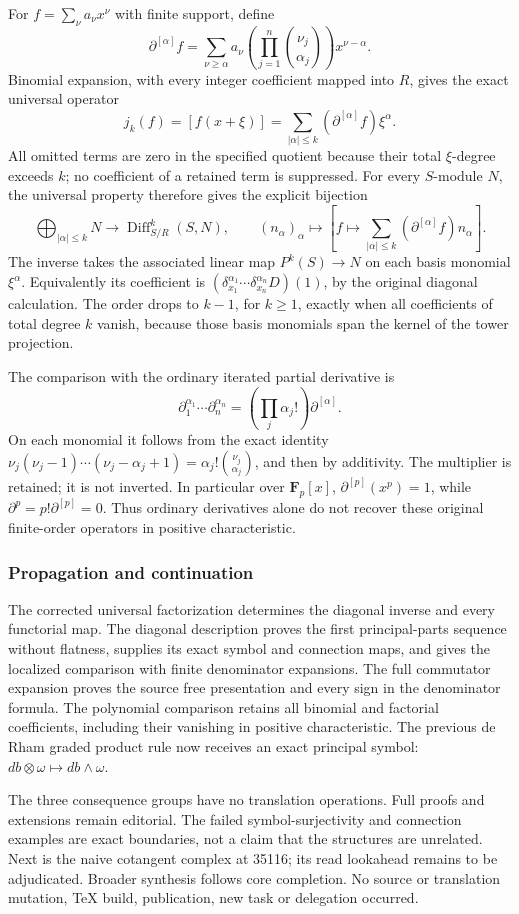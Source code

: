 For \(f=\sum_\nu a_\nu x^\nu\) with finite support, define \[
\partial^{[\alpha]}f
=\sum_{\nu\ge\alpha}a_\nu\left(\prod_{j=1}^n\binom{\nu_j}{\alpha_j}\right)x^{\nu-\alpha}.
\] Binomial expansion, with every integer coefficient mapped into \(R\), gives the exact universal operator \[
j_k(f)=[f(x+\xi)]=\sum_{|\alpha|\le k}(\partial^{[\alpha]}f)\xi^\alpha.
\] All omitted terms are zero in the specified quotient because their total \(\xi\)-degree exceeds \(k\); no coefficient of a retained term is suppressed. For every \(S\)-module \(N\), the universal property therefore gives the explicit bijection \[
\bigoplus_{|\alpha|\le k}N\longrightarrow\operatorname{Diff}^k_{S/R}(S,N),
\qquad(n_\alpha)_\alpha\longmapsto\left[f\mapsto\sum_{|\alpha|\le k}(\partial^{[\alpha]}f)n_\alpha\right].
\] The inverse takes the associated linear map \(P^k(S)\to N\) on each basis monomial \(\xi^\alpha\). Equivalently its coefficient is \((\delta_{x_1}^{\alpha_1}\cdots\delta_{x_n}^{\alpha_n}D)(1)\), by the original diagonal calculation. The order drops to \(k-1\), for \(k\ge1\), exactly when all coefficients of total degree \(k\) vanish, because those basis monomials span the kernel of the tower projection.

The comparison with the ordinary iterated partial derivative is \[
\partial_1^{\alpha_1}\cdots\partial_n^{\alpha_n}
=\left(\prod_j\alpha_j!\right)\partial^{[\alpha]}.
\] On each monomial it follows from the exact identity \(\nu_j(\nu_j-1)\cdots(\nu_j-\alpha_j+1)=\alpha_j!\binom{\nu_j}{\alpha_j}\), and then by additivity. The multiplier is retained; it is not inverted. In particular over \(\mathbf F_p[x]\), \(\partial^{[p]}(x^p)=1\), while \(\partial^p=p!\partial^{[p]}=0\). Thus ordinary derivatives alone do not recover these original finite-order operators in positive characteristic.

\subsubsection{Propagation and continuation}\label{propagation-and-continuation}

The corrected universal factorization determines the diagonal inverse and every functorial map. The diagonal description proves the first principal-parts sequence without flatness, supplies its exact symbol and connection maps, and gives the localized comparison with finite denominator expansions. The full commutator expansion proves the source free presentation and every sign in the denominator formula. The polynomial comparison retains all binomial and factorial coefficients, including their vanishing in positive characteristic. The previous de Rham graded product rule now receives an exact principal symbol: \(db\otimes\omega\mapsto db\wedge\omega\).

The three consequence groups have no translation operations. Full proofs and extensions remain editorial. The failed symbol-surjectivity and connection examples are exact boundaries, not a claim that the structures are unrelated. Next is the naive cotangent complex at 35116; its read lookahead remains to be adjudicated. Broader synthesis follows core completion. No source or translation mutation, TeX build, publication, new task or delegation occurred.
